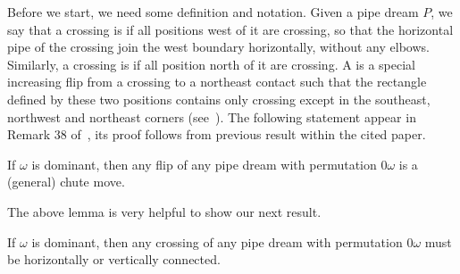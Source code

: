 Before we start, we need some definition and notation. Given a pipe dream $P$, we say that a crossing is  if all positions west of it are crossing,
so that the horizontal pipe of the crossing join the west boundary horizontally, without any elbows. Similarly, a crossing is   if all position north of it are crossing. A 
is a special increasing flip from a crossing to a northeast contact such that the rectangle defined by these two positions contains only crossing
except in the southeast, northwest and northeast corners (see~\cite[Figure 13]{CeballosPadrolSarmiento}). The following statement appear
in Remark 38 of~\cite{CeballosPadrolSarmiento}, its proof follows from previous result within the cited paper.


\begin{lemma}\label{lem:onlychute} 
If $\omega$ is dominant, then any flip of any pipe dream with permutation $0\omega$ is a (general) chute move.
\end{lemma}

The above lemma is very helpful to show our next result.

\begin{lemma}\label{lem:hv_connected} 
If $\omega$ is dominant, then any crossing of any pipe dream with permutation $0\omega$ must be horizontally or vertically connected.
\end{lemma}

